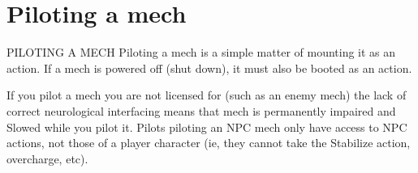 \chapter{Piloting a mech}
                                        PILOTING A MECH
Piloting a mech is a simple matter of mounting it as an action. If a mech is powered off (shut
down), it must also be booted as an action.


If you pilot a mech you are not licensed for (such as an enemy mech) the lack of correct
neurological interfacing means that mech is permanently impaired and Slowed while you pilot it.
Pilots piloting an NPC mech only have access to NPC actions, not those of a player character (ie,
they cannot take the Stabilize action, overcharge, etc).

